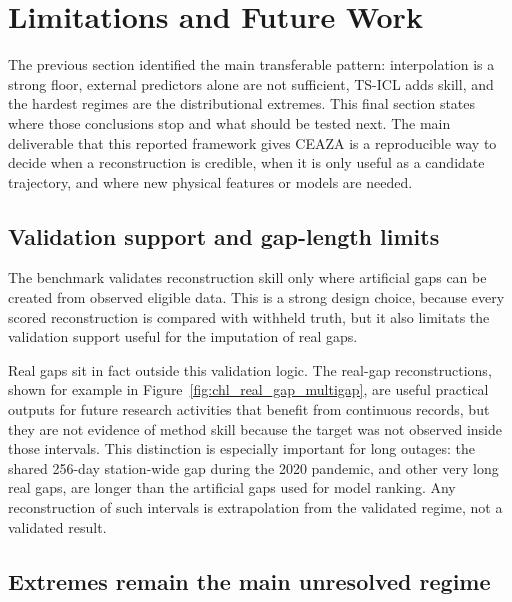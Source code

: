 \section{Limitations and Future Work}
\label{sec:limitations_future}

The previous section identified the main transferable pattern: interpolation is a strong floor,
external predictors alone are not sufficient, TS-ICL adds skill, and the hardest regimes are
the distributional extremes. This final section states where those conclusions stop and what should be tested next.
The main deliverable that this reported framework gives CEAZA
is a reproducible way to decide when a reconstruction is credible, when it is only useful as a candidate
trajectory, and where new physical features or models are needed.

\subsection{Validation support and gap-length limits}
\label{sec:limits_validation}

The benchmark validates reconstruction skill only where artificial gaps can be created from
observed eligible data. This is a strong design choice, because every scored reconstruction is
compared with withheld truth, but it also limitats the validation support useful for the imputation of real gaps.

Real gaps sit in fact outside this validation logic. The real-gap reconstructions, shown for example in
Figure~\ref{fig:chl_real_gap_multigap}, are useful practical outputs for future research activities that benefit from continuous records, but they are not evidence of
method skill because the target was not observed inside those intervals. This distinction is
especially important for long outages: the shared 256-day station-wide gap during the 2020 pandemic, and other very long
real gaps, are longer than the artificial gaps used for model ranking. Any reconstruction of
such intervals is extrapolation from the validated regime, not a validated result.

\subsection{Extremes remain the main unresolved regime}
\label{sec:limits_extremes}

